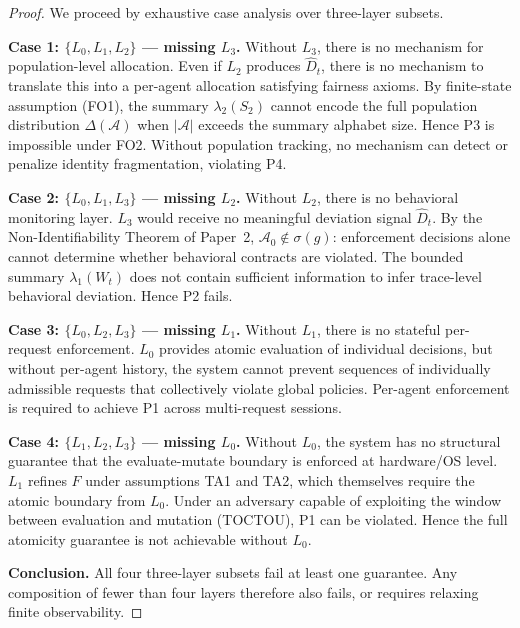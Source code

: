\documentclass[11pt]{article}
\newcommand{\Agents}{\mathcal{A}}
\newcommand{\Azero}{\mathcal{A}_0}
\newcommand{\Dhat}{\widehat{D}}
\newcommand{\State}[1]{S_{#1}}
\newcommand{\Sum}[1]{\lambda_{#1}}
\newcommand{\Layer}[1]{L_{#1}}
\begin{document}
\begin{proof}
We proceed by exhaustive case analysis over three-layer subsets.

\textbf{Case 1: $\{\Layer{0}, \Layer{1}, \Layer{2}\}$ --- missing $\Layer{3}$.}
Without $\Layer{3}$, there is no mechanism for population-level allocation. Even if $\Layer{2}$ produces $\Dhat_t$, there is no mechanism to translate this into a per-agent allocation satisfying fairness axioms. By finite-state assumption (FO1), the summary $\Sum{2}(\State{2})$ cannot encode the full population distribution $\Delta(\Agents)$ when $|\Agents|$ exceeds the summary alphabet size. Hence P3 is impossible under FO2. Without population tracking, no mechanism can detect or penalize identity fragmentation, violating P4.

\textbf{Case 2: $\{\Layer{0}, \Layer{1}, \Layer{3}\}$ --- missing $\Layer{2}$.}
Without $\Layer{2}$, there is no behavioral monitoring layer. $\Layer{3}$ would receive no meaningful deviation signal $\Dhat_t$. By the Non-Identifiability Theorem of Paper~2, $\Azero \notin \sigma(g)$: enforcement decisions alone cannot determine whether behavioral contracts are violated. The bounded summary $\Sum{1}(W_t)$ does not contain sufficient information to infer trace-level behavioral deviation. Hence P2 fails.

\textbf{Case 3: $\{\Layer{0}, \Layer{2}, \Layer{3}\}$ --- missing $\Layer{1}$.}
Without $\Layer{1}$, there is no stateful per-request enforcement. $\Layer{0}$ provides atomic evaluation of individual decisions, but without per-agent history, the system cannot prevent sequences of individually admissible requests that collectively violate global policies. Per-agent enforcement is required to achieve P1 across multi-request sessions.

\textbf{Case 4: $\{\Layer{1}, \Layer{2}, \Layer{3}\}$ --- missing $\Layer{0}$.}
Without $\Layer{0}$, the system has no structural guarantee that the evaluate-mutate boundary is enforced at hardware/OS level. $\Layer{1}$ refines $F$ under assumptions TA1 and TA2, which themselves require the atomic boundary from $\Layer{0}$. Under an adversary capable of exploiting the window between evaluation and mutation (TOCTOU), P1 can be violated. Hence the full atomicity guarantee is not achievable without $\Layer{0}$.

\textbf{Conclusion.}
All four three-layer subsets fail at least one guarantee. Any composition of fewer than four layers therefore also fails, or requires relaxing finite observability.
\end{proof}
\end{document}
